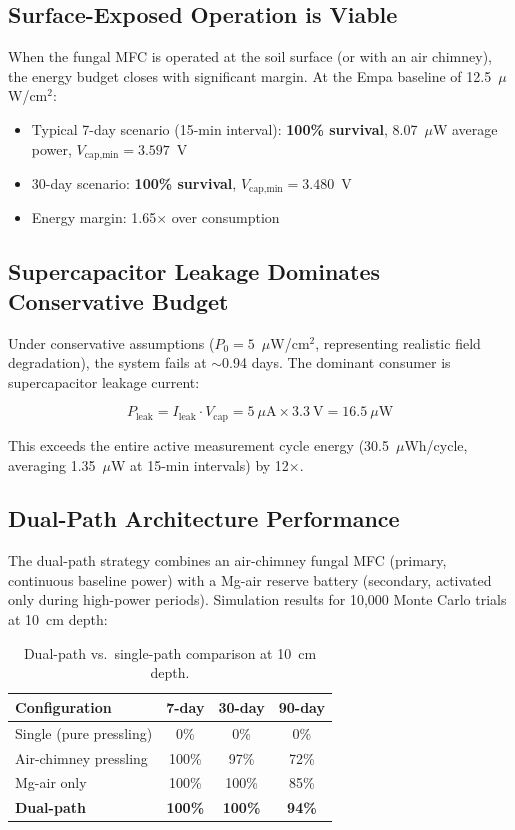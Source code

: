 \documentclass[twocolumn,10pt,a4paper]{article}
\begin{document}
\subsection{Surface-Exposed Operation is Viable}

When the fungal MFC is operated at the soil surface (or with an air chimney),
the energy budget closes with significant margin. At the Empa baseline of
12.5~$\mu$W/cm$^2$:
\begin{itemize}
    \item Typical 7-day scenario (15-min interval): \textbf{100\% survival},
          8.07~$\mu$W average power, $V_{\text{cap,min}} = 3.597$~V
    \item 30-day scenario: \textbf{100\% survival},
          $V_{\text{cap,min}} = 3.480$~V
    \item Energy margin: 1.65$\times$ over consumption
\end{itemize}

\subsection{Supercapacitor Leakage Dominates Conservative Budget}

Under conservative assumptions ($P_0 = 5$~$\mu$W/cm$^2$, representing
realistic field degradation), the system fails at $\sim$0.94 days. The
dominant consumer is supercapacitor leakage current:

\begin{equation}
P_{\text{leak}} = I_{\text{leak}} \cdot V_{\text{cap}} = 5~\mu\text{A} \times 3.3~\text{V} = 16.5~\mu\text{W}
\label{eq:leak}
\end{equation}

This exceeds the entire active measurement cycle energy (30.5~$\mu$Wh/cycle,
averaging 1.35~$\mu$W at 15-min intervals) by 12$\times$.

\subsection{Dual-Path Architecture Performance}

The dual-path strategy combines an air-chimney fungal MFC (primary,
continuous baseline power) with a Mg-air reserve battery (secondary,
activated only during high-power periods). Simulation results for 10,000
Monte Carlo trials at 10~cm depth:

\begin{table}[H]
\centering
\caption{Dual-path vs.\ single-path comparison at 10~cm depth.}
\label{tab:dual}
\begin{tabular}{lccc}
\toprule
Configuration & 7-day & 30-day & 90-day \\
\midrule
Single (pure pressling) & 0\% & 0\% & 0\% \\
Air-chimney pressling & 100\% & 97\% & 72\% \\
Mg-air only & 100\% & 100\% & 85\% \\
\textbf{Dual-path} & \textbf{100\%} & \textbf{100\%} & \textbf{94\%} \\
\bottomrule
\end{tabular}
\end{table}
\end{document}
